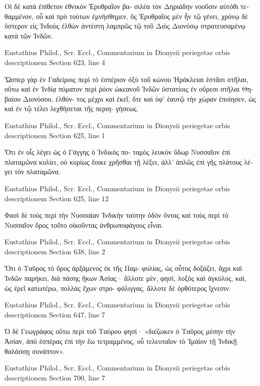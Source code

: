 \documentclass[12pt,letterpaper,twoside,final]{memoir}
\begin{document}
\begin{greek}
        Οἱ δὲ κατὰ ἐπίθετον ἐθνικὸν Ἐρυθραῖον βα-
σιλέα τὸν Δηριάδην νοοῦσιν αὐτόθι τεθαμμένον, οὗ 
καὶ πρὸ τούτων ἐμνήσθημεν, ὃς Ἐρυθραῖος μὲν ἦν τῷ 
γένει, χρόνῳ δὲ ὕστερον εἰς Ἰνδοὺς ἐλθὼν ἀντέστη 
λαμπρῶς τῷ τοῦ Διὸς Διονύσῳ στρατευσαμένῳ κατὰ 
τῶν Ἰνδῶν. 



Eustathius Philol., Scr. Eccl., Commentarium in Dionysii periegetae orbis descriptionem 
Section 623, line 4

                   Ὥσπερ γὰρ ἐν Γαδείροις περὶ τὸ 
ἑσπέριον ὀξὺ τοῦ κώνου Ἡράκλειαι ἑστᾶσι στῆλαι, 
οὕτω καὶ ἐν Ἰνδίᾳ πύματον περὶ ῥόον ὠκεανοῦ Ἰνδῶν 
ὑστατίοις ἐν οὔρεσι στῆλαι Θηβαίου Διονύσου, ἐλθόν-
τος μέχρι καὶ ἐκεῖ, ὅτε καὶ ὑφ' ἑαυτῷ τὴν χώραν 
ἐποίησεν, ὡς καὶ ἐν τῷ τέλει λεχθήσεται τῆς περιη-
γήσεως. 



Eustathius Philol., Scr. Eccl., Commentarium in Dionysii periegetae orbis descriptionem 
Section 625, line 1

Ὅτι ἐν οἷς λέγει ὡς ὁ Γάγγης ὁ Ἰνδικὸς πο-
ταμὸς λευκὸν ὕδωρ Νυσσαῖον ἐπὶ πλαταμῶνα κυλίει, 
οὐ κυρίως ἔοικε χρῆσθαι τῇ λέξει, ἀλλ' ἁπλῶς ἐπὶ γῆς 
πλάτους λέγει τὸν πλαταμῶνα. 



Eustathius Philol., Scr. Eccl., Commentarium in Dionysii periegetae orbis descriptionem 
Section 625, line 12

                     Φασὶ δὲ τοὺς περὶ τὴν Νυσσαίαν 
Ἰνδικὴν ταύτην ὁδὸν ὄντας καὶ τοὺς περὶ τὸ Νυσσαῖον 
ὄρος τοῦτο οἰκοῦντας ἀνθρωποφάγους εἶναι. 



Eustathius Philol., Scr. Eccl., Commentarium in Dionysii periegetae orbis descriptionem 
Section 638, line 2

Ὅτι ὁ Ταῦρος τὸ ὄρος ἀρξάμενος ἐκ τῆς Παμ-
φυλίας, ὡς οὗτος δοξάζει, ἄχρι καὶ Ἰνδῶν παρήκει, 
διὰ πάσης ἥκων Ἀσίας· ἄλλοτε μὲν, φησὶ, λοξὸς καὶ 
ἀγκύλος, καὶ, ὡς ἐρεῖ κατωτέρω, πολλὰς ἔχων στρο-
φάλιγγας, ἄλλοτε δὲ ὀρθότερος ἴχνεσιν. 



Eustathius Philol., Scr. Eccl., Commentarium in Dionysii periegetae orbis descriptionem 
Section 647, line 7

                     Ὁ δὲ Γεωγράφος οὕτω περὶ τοῦ 
Ταύρου φησί· «διέζωκεν ὁ Ταῦρος μέσην τὴν Ἀσίαν, 
ἀπὸ ἑσπέρας ἐπὶ τὴν ἕω τετραμμένος, οὗ τελευταῖον 
τὸ Ἰμάϊον τῇ Ἰνδικῇ θαλάσσῃ συνάπτον». 



Eustathius Philol., Scr. Eccl., Commentarium in Dionysii periegetae orbis descriptionem 
Section 700, line 7


\end{greek}
\end{document}
